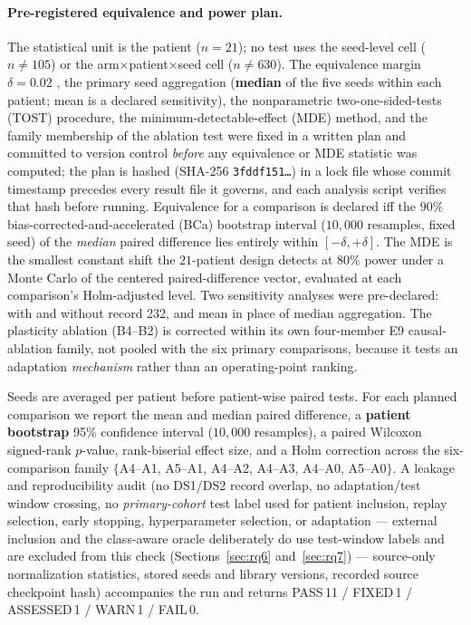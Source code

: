 \paragraph{Pre-registered equivalence and power plan.} The statistical unit is
the patient ($n = 21$); no test uses the seed-level cell ($n \neq 105$) or the
arm$\times$patient$\times$seed cell ($n \neq 630$). The equivalence margin
$\delta = 0.02$ \macrof{}, the primary seed aggregation (\textbf{median} of the
five seeds within each patient; mean is a declared sensitivity), the
nonparametric two-one-sided-tests (TOST) procedure, the minimum-detectable-effect
(MDE) method, and the family membership of the ablation test were fixed in a
written plan and committed to version control \emph{before} any equivalence or
MDE statistic was computed; the plan is hashed (SHA-256 \texttt{3fddf151\ldots})
in a lock file whose commit timestamp precedes every result file it governs, and
each analysis script verifies that hash before running. Equivalence for a
comparison is declared iff the $90\%$ bias-corrected-and-accelerated (BCa)
bootstrap interval ($10{,}000$ resamples, fixed seed) of the \emph{median} paired
difference lies entirely within $[-\delta, +\delta]$. The MDE is the smallest
constant shift the $21$-patient design detects at $80\%$ power under a Monte
Carlo of the centered paired-difference vector, evaluated at each comparison's
Holm-adjusted level. Two sensitivity analyses were pre-declared: with and without
record 232, and mean in place of median aggregation. The plasticity ablation
(B4--B2) is corrected within its own four-member E9 causal-ablation family, not
pooled with the six primary comparisons, because it tests an adaptation
\emph{mechanism} rather than an operating-point ranking.

Seeds are averaged per patient before
patient-wise paired tests. For each planned comparison we report the mean and
median paired difference, a \textbf{patient bootstrap} 95\% confidence
interval ($10{,}000$ resamples), a paired Wilcoxon signed-rank $p$-value,
rank-biserial effect size, and a Holm correction across the six-comparison
family $\{$A4--A1, A5--A1, A4--A2, A4--A3, A4--A0, A5--A0$\}$. A leakage and
reproducibility audit (no DS1/DS2 record overlap, no adaptation/test window
crossing, no \emph{primary-cohort} test label used for patient inclusion,
replay selection, early stopping, hyperparameter selection, or adaptation ---
external inclusion and the class-aware oracle deliberately do use test-window
labels and are excluded from this check (Sections~\ref{sec:rq6}
and~\ref{sec:rq7}) --- source-only
normalization statistics, stored seeds and library versions, recorded source
checkpoint hash) accompanies the run and returns PASS\,11 / FIXED\,1 / ASSESSED\,1 / WARN\,1 /
FAIL\,0.

